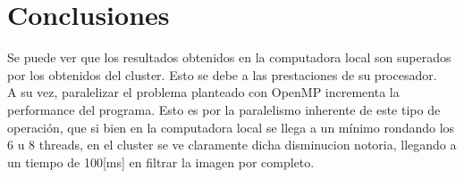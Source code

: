 \documentclass{article}
\begin{document}
\section{Conclusiones}

Se puede ver que los resultados obtenidos en la computadora local son superados por los obtenidos del cluster. Esto se debe a las prestaciones de su procesador. \\

A su vez, paralelizar el problema planteado con OpenMP incrementa la performance del programa. Esto es por la paralelismo inherente de este tipo de operación, que si bien en la computadora local se llega a un mínimo rondando los 6 u 8 threads, en el cluster se ve claramente dicha disminucion notoria, llegando a un tiempo de 100[ms] en filtrar la imagen por completo. \\
\end{document}
